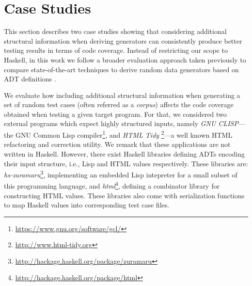 \section{Case Studies} \label{sec:casestudies}

%
%
This section describes two case studies showing that considering additional
structural information when deriving generators can consistently produce better
testing results in terms of code coverage.
%
Instead of restricting our scope to Haskell, in this work we follow a broader
evaluation approach taken previously to compare state-of-the-art techniques to
derive random data generators based on ADT definitions
\cite{grieco2017,DBLP:conf/haskell/MistaRH18}.
%

We evaluate how including additional structural information when generating a
set of random test cases (often referred as a \emph{corpus}) affects the code
coverage obtained when testing a given target program.
%
For that, we considered two external programs which expect highly structured
inputs, namely \emph{GNU CLISP}---the GNU Common Lisp
compiler\footnote{\href{https://www.gnu.org/software/gcl/}{https://www.gnu.org/software/gcl/}},
and \emph{HTML Tidy}
\footnote{\href{http://www.html-tidy.org}{http://www.html-tidy.org}}---a well
known HTML refactoring and correction utility.
%
We remark that these applications are not written in Haskell.
%
However, there exist Haskell libraries defining ADTs encoding their input
structure, i.e., Lisp and HTML values respectively. These libraries are:
\emph{hs-zuramaru}\footnote{\href{http://hackage.haskell.org/package/zuramaru}{http://hackage.haskell.org/package/zuramaru}},
implementing an embedded Lisp intepreter for a small subset of this programming
language, and
\emph{html}\footnote{\href{http://hackage.haskell.org/package/html}{http://hackage.haskell.org/package/html}},
defining a combinator library for constructing HTML values.
%
These libraries also come with serialization functions to map Haskell values
into corresponding test case files.


